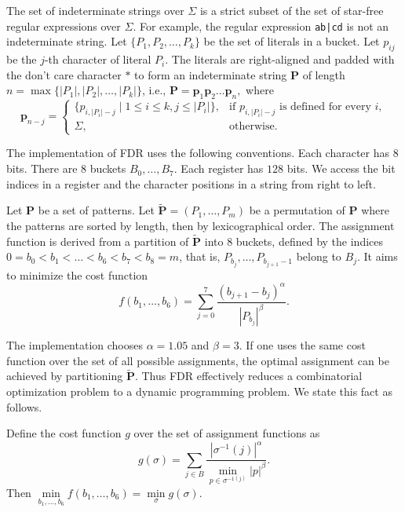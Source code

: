The set of indeterminate strings over $\Sigma$ is a strict subset of the set of star-free regular expressions over $\Sigma$. For example, the regular expression \texttt{ab|cd} is not an indeterminate string. Let $\{P_1, P_2, \ldots, P_k\}$ be the set of literals in a bucket. Let $p_{ij}$ be the $j$-th character of literal $P_i$. The literals are right-aligned and padded with the don't care character $*$ to form an indeterminate string $\bm{P}$ of length $n = \max\{|P_1|, |P_2|, \ldots, |P_k|\}$, i.e., $\bm{P} = \bm{p}_1  \bm{p}_2  \ldots \bm{p}_{n},$ where
$$\bm{p}_{n-j}=
  \begin{cases}
    \{p_{i, |P_i|-j} \mid 1 \le i \le k, j \le |P_i|\}, & \text{if $p_{i, |P_i|-j}$ is defined for every $i$}, \\
    \Sigma,                                             & \text{otherwise}.
  \end{cases}
$$

The implementation of FDR uses the following conventions. Each character has $8$ bits. There are $8$ buckets $B_0, \ldots, B_7$. Each register has $128$ bits. We access the bit indices in a register and the character positions in a string from right to left.

Let $\bm{P}$ be a set of patterns. Let $\tilde{\bm{P}}=(P_1,\ldots, P_m)$ be a permutation of $\bm{P}$ where the patterns are sorted by length, then by lexicographical order. The assignment function is derived from a partition of $\tilde{\bm{P}}$ into 8 buckets, defined by the indices $0=b_0 < b_1 < \ldots < b_6 < b_7 < b_8 = m$, that is, $P_{b_j},\ldots, P_{b_{j+1}-1}$ belong to $B_j$. It aims to minimize the cost function
\begin{equation}
  f(b_1,\ldots, b_6) = \sum_{j=0}^{7}\dfrac{(b_{j+1}-b_{j})^\alpha}{|P_{b_{j}}|^\beta}.
\end{equation}

The implementation chooses $\alpha=1.05$ and $\beta=3$. If one uses the same cost function over the set of all possible assignments, the optimal assignment can be achieved by partitioning $\tilde{\bm{P}}$. Thus FDR effectively reduces a combinatorial optimization problem to a dynamic programming problem. We state this fact as follows.

\begin{proposition}
  Define the cost function $g$ over the set of assignment functions as
  $$g(\sigma) = \sum_{j\in B}\dfrac{|\sigma^{-1}(j)|^\alpha}{\min\limits_{p \in \sigma^{-1(j)}} |p|^\beta}.$$
  Then $\min\limits_{b_1,\ldots,b_6}f(b_1,\ldots, b_6) = \min\limits_{\sigma} g(\sigma).$
\end{proposition}

